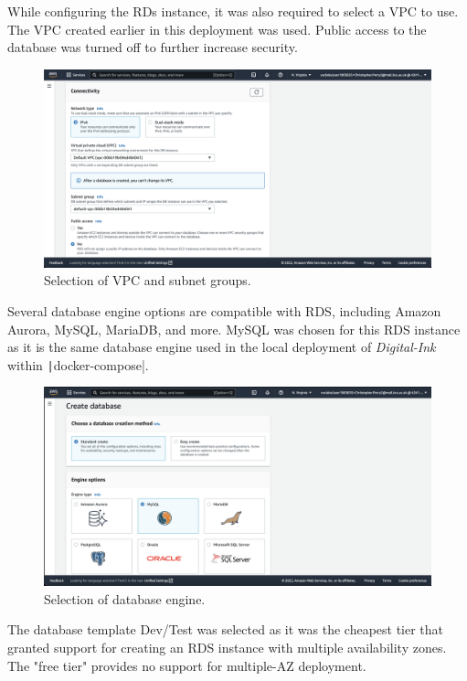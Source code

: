 While configuring the RDs instance, it was also required to select a VPC to use.
The VPC created earlier in this deployment was used.
Public access to the database was turned off to further increase security.

\begin{figure}[!htbp]
    \centering
    \includegraphics[width=\textwidth]{resources/rds/rds-connectivity-1}
    \caption{Selection of VPC and subnet groups.}
    \label{fig:rds-connecting}
\end{figure}

\clearpage
Several database engine options are compatible with RDS, including Amazon Aurora, MySQL, MariaDB, and more.
MySQL was chosen for this RDS instance as it is the same database engine used in the local deployment of
\textit{Digital-Ink} within \texttt|docker-compose|.

\begin{figure}[!htbp]
    \centering
    \includegraphics[width=\textwidth]{resources/rds/rds-create-engine}
    \caption{Selection of database engine.}
    \label{fig:rds-engine}
\end{figure}

The database template Dev/Test was selected as it was the cheapest tier that granted support for creating an RDS
instance with multiple availability zones.
The "free tier" provides no support for multiple-AZ deployment.

